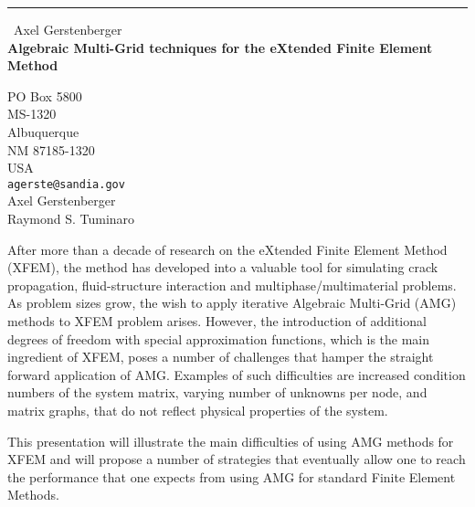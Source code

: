 \documentclass{report}
\begin{document}
\begin{center}
\rule{6in}{1pt} \
{\large Axel Gerstenberger \\
{\bf Algebraic Multi-Grid techniques for the eXtended Finite Element Method }}

PO Box 5800 \\ MS-1320 \\ Albuquerque \\ NM 87185-1320 \\ USA
\\
{\tt agerste@sandia.gov}\\
Axel Gerstenberger\\
Raymond S. Tuminaro\end{center}

After more than a decade of research on the eXtended Finite Element
Method (XFEM), the method has developed into a valuable tool for
simulating crack propagation, fluid-structure interaction and
multiphase/multimaterial problems. As problem sizes grow, the wish to
apply iterative Algebraic Multi-Grid (AMG) methods to XFEM problem
arises. However, the introduction of additional degrees of freedom with
special approximation functions, which is the main ingredient of XFEM,
poses a number of challenges that hamper the straight forward application
of AMG. Examples of such difficulties are increased condition numbers of
the system matrix, varying number of unknowns per node, and matrix
graphs, that do not reflect physical properties of the system.

This presentation will illustrate the main difficulties of using AMG
methods for XFEM and will propose a number of strategies that eventually
allow one to reach the performance that one expects from using AMG for
standard Finite Element Methods.
\end{document}
